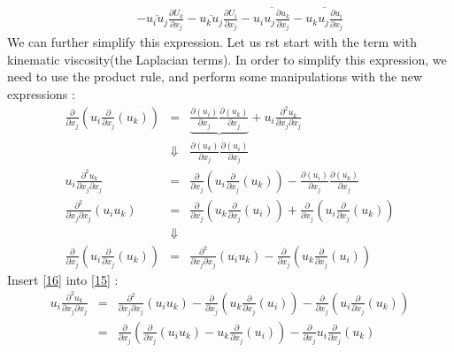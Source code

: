 \documentclass[11pt]{article}
\begin{document}
{\begin{eqnarray}
 &  & -\overline{u_{i}u_{j}}\frac{\partial U_{k}}{\partial x_{j}}-\overline{u_{k}u_{j}}\frac{\partial U_{i}}{\partial x_{j}}-\overline{u_{i}u_{j}\frac{\partial u_{k}}{\partial x_{j}}}-\overline{u_{k}u_{j}\frac{\partial u_{i}}{\partial x_{j}}}
\end{eqnarray}
We can further simplify this expression. Let us rst start with the
term with kinematic viscosity(the Laplacian terms). In order to simplify
this expression, we need to use the product rule, and perform some
manipulations with the new expressions :
\begin{eqnarray}
\frac{\partial}{\partial x_{j}}\left(u_{i}\frac{\partial}{\partial x_{j}}(u_{k})\right) & = & \underbrace{\frac{\partial(u_{i})}{\partial x_{j}}\frac{\partial(u_{k})}{\partial x_{j}}}+u_{i}\frac{\partial^{2}u_{k}}{\partial x_{j}\partial x_{j}}\nonumber \\ 
 & \Downarrow & \frac{\partial(u_{k})}{\partial x_{j}}\frac{\partial(u_{i})}{\partial x_{j}}\nonumber \\ \label{15}
u_{i}\frac{\partial^{2}u_{k}}{\partial x_{j}\partial x_{j}} & = & \frac{\partial}{\partial x_{j}}\left(u_{i}\frac{\partial}{\partial x_{j}}(u_{k})\right)-\frac{\partial(u_{i})}{\partial x_{j}}\frac{\partial(u_{k})}{\partial x_{j}}\\
\frac{\partial^{2}}{\partial x_{j}\partial x_{j}}(u_{i}u_{k}) & = & \frac{\partial}{\partial x_{j}}\left(u_{k}\frac{\partial}{\partial x_{j}}(u_{i})\right)+\frac{\partial}{\partial x_{j}}\left(u_{i}\frac{\partial}{\partial x_{j}}(u_{k})\right)\nonumber \\
 & \Downarrow\nonumber \\ \label{16}
\frac{\partial}{\partial x_{j}}\left(u_{i}\frac{\partial}{\partial x_{j}}(u_{k})\right) & = & \frac{\partial^{2}}{\partial x_{j}\partial x_{j}}(u_{i}u_{k})-\frac{\partial}{\partial x_{j}}\left(u_{k}\frac{\partial}{\partial x_{j}}(u_{i})\right)
\end{eqnarray}
Insert \eqref{16} into \eqref{15} : 
\begin{eqnarray}
u_{i}\frac{\partial^{2}u_{k}}{\partial x_{j}\partial x_{j}} & = & \frac{\partial^{2}}{\partial x_{j}\partial x_{j}}(u_{i}u_{k})-\frac{\partial}{\partial x_{j}}\left(u_{k}\frac{\partial}{\partial x_{j}}(u_{i})\right)-\frac{\partial}{\partial x_{j}}\left(u_{i}\frac{\partial}{\partial x_{j}}(u_{k})\right)\nonumber \\ \label{17}
 & = & \frac{\partial}{\partial x_{j}}\left(\frac{\partial}{\partial x_{j}}(u_{i}u_{k})-u_{k}\frac{\partial}{\partial x_{j}}(u_{i})\right)-\frac{\partial}{\partial x_{j}}u_{i}\frac{\partial}{\partial x_{j}}(u_{k})

\end{eqnarray}}
\end{document}
